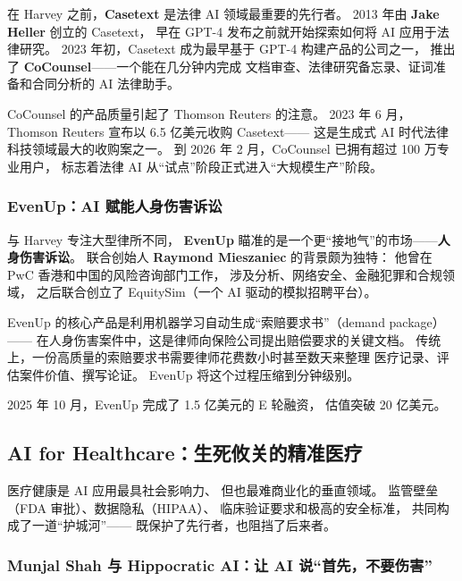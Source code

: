 在 Harvey 之前，\textbf{Casetext} 是法律 AI 领域最重要的先行者。
2013 年由 \textbf{Jake Heller} 创立的 Casetext，
早在 GPT-4 发布之前就开始探索如何将 AI 应用于法律研究。
2023 年初，Casetext 成为最早基于 GPT-4 构建产品的公司之一，
推出了 \textbf{CoCounsel}——一个能在几分钟内完成
文档审查、法律研究备忘录、证词准备和合同分析的 AI 法律助手。

CoCounsel 的产品质量引起了 Thomson Reuters 的注意。
2023 年 6 月，Thomson Reuters 宣布以 6.5 亿美元收购 Casetext——
这是生成式 AI 时代法律科技领域最大的收购案之一。
到 2026 年 2 月，CoCounsel 已拥有超过 100 万专业用户，
标志着法律 AI 从``试点''阶段正式进入``大规模生产''阶段。

\subsubsection{EvenUp：AI 赋能人身伤害诉讼}

与 Harvey 专注大型律所不同，
\textbf{EvenUp} 瞄准的是一个更``接地气''的市场——\textbf{人身伤害诉讼}。
联合创始人 \textbf{Raymond Mieszaniec} 的背景颇为独特：
他曾在 PwC 香港和中国的风险咨询部门工作，
涉及分析、网络安全、金融犯罪和合规领域，
之后联合创立了 EquitySim（一个 AI 驱动的模拟招聘平台）。

EvenUp 的核心产品是利用机器学习自动生成``索赔要求书''（demand package）——
在人身伤害案件中，这是律师向保险公司提出赔偿要求的关键文档。
传统上，一份高质量的索赔要求书需要律师花费数小时甚至数天来整理
医疗记录、评估案件价值、撰写论证。
EvenUp 将这个过程压缩到分钟级别。

2025 年 10 月，EvenUp 完成了 1.5 亿美元的 E 轮融资，
估值突破 20 亿美元。


\subsection{AI for Healthcare：生死攸关的精准医疗}
\label{subsec:healthcare-ai}

医疗健康是 AI 应用最具社会影响力、
但也最难商业化的垂直领域。
监管壁垒（FDA 审批）、数据隐私（HIPAA）、
临床验证要求和极高的安全标准，
共同构成了一道``护城河''——
既保护了先行者，也阻挡了后来者。

\subsubsection{Munjal Shah 与 Hippocratic AI：让 AI 说``首先，不要伤害''}

